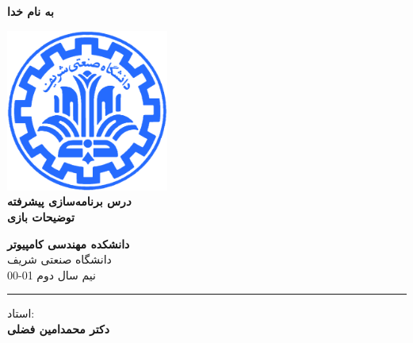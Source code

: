 \documentclass[]{article}
\begin{document}
\begin{titlepage}
\begin{center}

\textbf{ \Huge{به نام خدا} }
        
\vspace{0.2cm}

\includegraphics[width=0.4\textwidth]{sharif1.png}\\
\vspace{0.2cm}
\textbf{ \Huge{\emph درس برنامه‌سازی پیشرفته} }\\
\vspace{0.25cm}
\textbf{ \Large{توضیحات بازی} }
\vspace{0.2cm}
       
 
      \large \textbf{دانشکده مهندسی کامپیوتر}\\\vspace{0.1cm}
    \large   دانشگاه صنعتی شریف\\\vspace{0.2cm}
       \large   ﻧﯿﻢ سال دوم 01-00 \\\vspace{0.10cm}
      \noindent\rule[1ex]{\linewidth}{1pt}
استاد:\\
    \textbf{{دکتر محمدامین فضلی}}



    \vspace{0.20cm}


\end{center}
\end{titlepage}


\tableofcontents
\newpage
\pagestyle{fancy}
\fancyhf{}
\fancyfoot{}
\cfoot{\thepage}
\renewcommand{\headrulewidth}{2pt}
\end{document}
